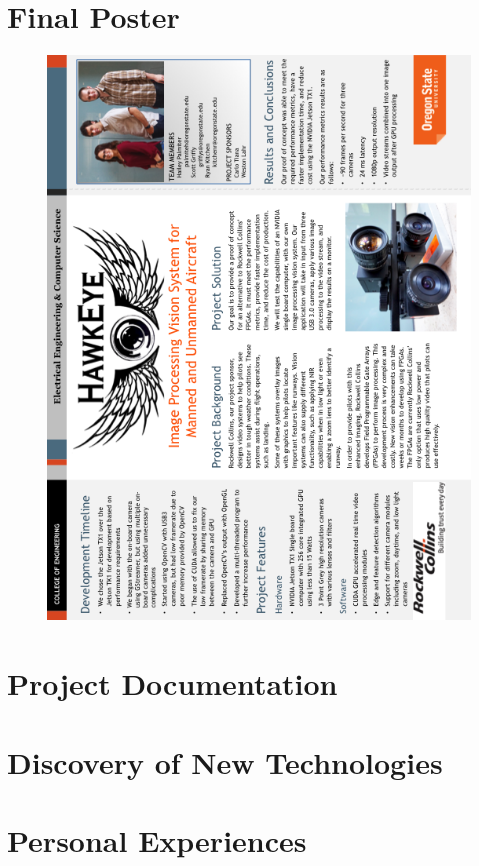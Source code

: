 \documentclass[letterpaper, onecolumn,10pt,draftclsnofoot]{IEEEtran}
\begin{document}
\section{Final Poster}
\begin{figure}[H] 
	\centering
	\includegraphics[width=\textwidth,height=\textheight,keepaspectratio]{images/HawkEye_Poster.png}  
	\end{figure}

\section{Project Documentation}
	

\section{Discovery of New Technologies}
	
	
\section{Personal Experiences}
\end{document}
